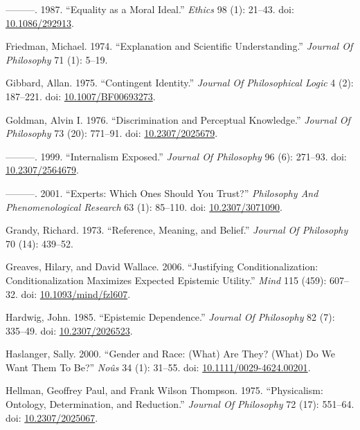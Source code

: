 \documentclass[
  10pt,
  letterpaper,
  DIV=11,
  numbers=noendperiod,
  twoside]{scrartcl}
\newlength{\cslhangindent}
\newenvironment{CSLReferences}[2] %
 {\begin{list}{}{%
  \setlength{\itemindent}{0pt}
  \setlength{\leftmargin}{0pt}
  \setlength{\parsep}{0pt}
  \ifodd #1
   \setlength{\leftmargin}{\cslhangindent}
   \setlength{\itemindent}{-1\cslhangindent}
  \fi
  \setlength{\itemsep}{#2\baselineskip}}}
 {\end{list}}
\begin{document}
\begin{CSLReferences}{1}{0}
---------. 1987. {``Equality as a Moral Ideal.''} \emph{Ethics} 98 (1):
21--43. doi: \href{https://doi.org/10.1086/292913}{10.1086/292913}.

Friedman, Michael. 1974. {``Explanation and Scientific Understanding.''}
\emph{Journal Of Philosophy} 71 (1): 5--19.

Gibbard, Allan. 1975. {``Contingent Identity.''} \emph{Journal Of
Philosophical Logic} 4 (2): 187--221. doi:
\href{https://doi.org/10.1007/BF00693273}{10.1007/BF00693273}.

Goldman, Alvin I. 1976. {``Discrimination and Perceptual Knowledge.''}
\emph{Journal Of Philosophy} 73 (20): 771--91. doi:
\href{https://doi.org/10.2307/2025679}{10.2307/2025679}.

---------. 1999. {``Internalism Exposed.''} \emph{Journal Of Philosophy}
96 (6): 271--93. doi:
\href{https://doi.org/10.2307/2564679}{10.2307/2564679}.

---------. 2001. {``Experts: Which Ones Should You Trust?''}
\emph{Philosophy And Phenomenological Research} 63 (1): 85--110. doi:
\href{https://doi.org/10.2307/3071090}{10.2307/3071090}.

Grandy, Richard. 1973. {``Reference, Meaning, and Belief.''}
\emph{Journal Of Philosophy} 70 (14): 439--52.

Greaves, Hilary, and David Wallace. 2006. {``Justifying
Conditionalization: Conditionalization Maximizes Expected Epistemic
Utility.''} \emph{Mind} 115 (459): 607--32. doi:
\href{https://doi.org/10.1093/mind/fzl607}{10.1093/mind/fzl607}.

Hardwig, John. 1985. {``Epistemic Dependence.''} \emph{Journal Of
Philosophy} 82 (7): 335--49. doi:
\href{https://doi.org/10.2307/2026523}{10.2307/2026523}.

Haslanger, Sally. 2000. {``Gender and Race: (What) Are They? (What) Do
We Want Them To Be?''} \emph{Noûs} 34 (1): 31--55. doi:
\href{https://doi.org/10.1111/0029-4624.00201}{10.1111/0029-4624.00201}.

Hellman, Geoffrey Paul, and Frank Wilson Thompson. 1975. {``Physicalism:
Ontology, Determination, and Reduction.''} \emph{Journal Of Philosophy}
72 (17): 551--64. doi:
\href{https://doi.org/10.2307/2025067}{10.2307/2025067}.


\end{CSLReferences}
\end{document}
